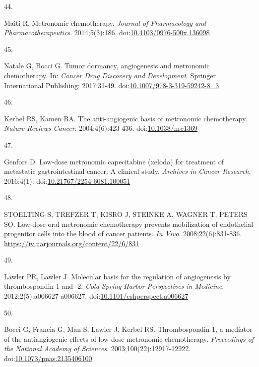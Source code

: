 \documentclass[11pt]{umnthesis}
\newlength{\csllabelwidth}
\newlength{\cslhangindent}
\newenvironment{CSLReferences}[2] %
 {%
  \setlength{\parindent}{0pt}
  \ifodd #1 \everypar{\setlength{\hangindent}{\cslhangindent}}\ignorespaces\fi
  \ifnum #2 > 0
  \setlength{\parskip}{#2\baselineskip}
  \fi
 }%
 {}
\newcommand{\CSLLeftMargin}[1]{\parbox[t]{\csllabelwidth}{#1}}
\newcommand{\CSLRightInline}[1]{\parbox[t]{\linewidth - \csllabelwidth}{#1}}
\begin{document}
\begin{CSLReferences}{0}{0}
\leavevmode{}%
\CSLLeftMargin{44. }
\CSLRightInline{Maiti R. Metronomic chemotherapy. \emph{Journal of Pharmacology and Pharmacotherapeutics}. 2014;5(3):186. doi:\href{https://doi.org/10.4103/0976-500x.136098}{10.4103/0976-500x.136098}}

\leavevmode{}%
\CSLLeftMargin{45. }
\CSLRightInline{Natale G, Bocci G. Tumor dormancy, angiogenesis and metronomic chemotherapy. In: \emph{Cancer Drug Discovery and Development}. Springer International Publishing; 2017:31-49. doi:\href{https://doi.org/10.1007/978-3-319-59242-8_3}{10.1007/978-3-319-59242-8\_3}}

\leavevmode{}%
\CSLLeftMargin{46. }
\CSLRightInline{Kerbel RS, Kamen BA. The anti-angiogenic basis of metronomic chemotherapy. \emph{Nature Reviews Cancer}. 2004;4(6):423-436. doi:\href{https://doi.org/10.1038/nrc1369}{10.1038/nrc1369}}

\leavevmode{}%
\CSLLeftMargin{47. }
\CSLRightInline{Genfors D. Low-dose metronomic capecitabine (xeloda) for treatment of metastatic gastrointestinal cancer: A clinical study. \emph{Archives in Cancer Research}. 2016;4(1). doi:\href{https://doi.org/10.21767/2254-6081.100051}{10.21767/2254-6081.100051}}

\leavevmode{}%
\CSLLeftMargin{48. }
\CSLRightInline{STOELTING S, TREFZER T, KISRO J, STEINKE A, WAGNER T, PETERS SO. Low-dose oral metronomic chemotherapy prevents mobilization of endothelial progenitor cells into the blood of cancer patients. \emph{In Vivo}. 2008;22(6):831-836. \url{https://iv.iiarjournals.org/content/22/6/831}}

\leavevmode{}%
\CSLLeftMargin{49. }
\CSLRightInline{Lawler PR, Lawler J. Molecular basis for the regulation of angiogenesis by thrombospondin-1 and -2. \emph{Cold Spring Harbor Perspectives in Medicine}. 2012;2(5):a006627-a006627. doi:\href{https://doi.org/10.1101/cshperspect.a006627}{10.1101/cshperspect.a006627}}

\leavevmode{}%
\CSLLeftMargin{50. }
\CSLRightInline{Bocci G, Francia G, Man S, Lawler J, Kerbel RS. Thrombospondin 1, a mediator of the antiangiogenic effects of low-dose metronomic chemotherapy. \emph{Proceedings of the National Academy of Sciences}. 2003;100(22):12917-12922. doi:\href{https://doi.org/10.1073/pnas.2135406100}{10.1073/pnas.2135406100}}


\end{CSLReferences}
\end{document}
